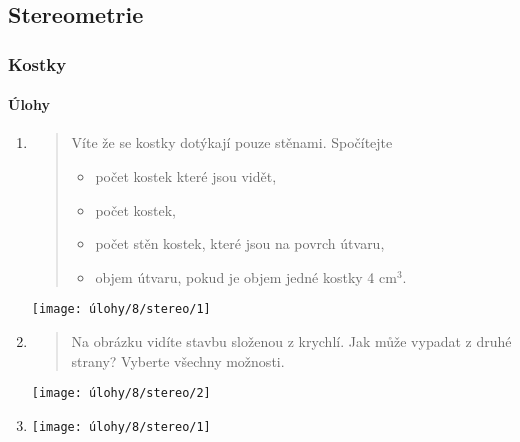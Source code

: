\newpage

\subsection{Stereometrie}
\label{subsec:stereometrie}

\subsubsection{Kostky}

\paragraph{Úlohy}
\begin{enumerate}
	\item
	\begin{minipage}[t]{\linewidth}
		\begin{quote}
			 Víte že se kostky dotýkají pouze stěnami. Spočítejte
			\begin{itemize}
				\item počet kostek které jsou vidět,
				\item počet kostek,
				\item počet stěn kostek, které jsou na povrch útvaru,
				\item objem útvaru, pokud je objem jedné kostky 4 cm$^{3}$.
			\end{itemize}
		\end{quote}
		\centering
		 \texttt{[image: úlohy/8/stereo/1]}				
	\end{minipage}

	\item
	\begin{minipage}[t]{\linewidth}
		\begin{quote}
			Na obrázku vidíte stavbu složenou z krychlí. Jak může vypadat z druhé strany? Vyberte všechny možnosti.
		\end{quote}
		\centering
		\texttt{[image: úlohy/8/stereo/2]}				
	\end{minipage}

	\item
	\begin{minipage}[t]{\linewidth}
		\begin{quote}
			
		\end{quote}
		\centering
		\texttt{[image: úlohy/8/stereo/1]}				
	\end{minipage}
	

\end{enumerate}
